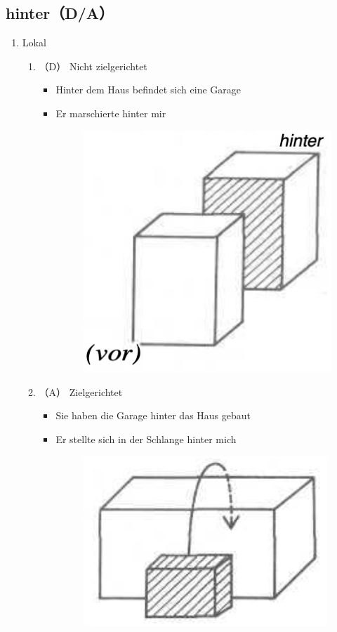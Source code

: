 \documentclass[UTF8]{report}
\begin{document}
\subsection{hinter（D/A）}

\begin{enumerate}
    \item Lokal
    \begin{enumerate}
        \item （D） Nicht zielgerichtet
        \begin{itemize}
            \item Hinter dem Haus befindet sich eine Garage
            \item Er marschierte hinter mir
            \begin{figure}[H]
                \centering
                \includegraphics[scale=0.3]{hinter1.png}
            \end{figure}
        \end{itemize}
        \item （A） Zielgerichtet
        \begin{itemize}
            \item Sie haben die Garage hinter das Haus gebaut
            \item Er stellte sich in der Schlange hinter mich
            \begin{figure}[H]
                \centering
                \includegraphics[scale=0.3]{hinter2.png}

\end{figure}
\end{itemize}
\end{enumerate}
\end{enumerate}
\end{document}
